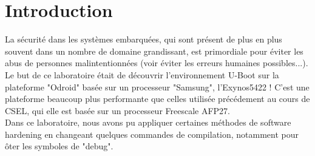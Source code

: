 
\chapter{Introduction} %

\label{Chapitre 1} %


La sécurité dans les systèmes embarquées, qui sont présent de plus en plus souvent dans un nombre de domaine grandissant, est primordiale pour éviter les abus de personnes malintentionnées (voir éviter les erreurs humaines possibles...).\\

 Le but de ce laboratoire était de découvrir l'environnement U-Boot sur la plateforme "Odroid" basée sur un processeur "Samsung", l'Exynos5422 ! C'est une plateforme beaucoup plus performante que celles utilisée précédement au cours de CSEL, qui elle est basée sur un processeur Freescale AFP27.\\ 

Dans ce laboratoire, nous avons pu appliquer certaines méthodes de software hardening en changeant quelques commandes de compilation, notamment pour ôter les symboles de "debug".


























